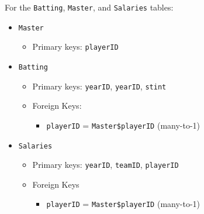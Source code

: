 \documentclass[]{book}
\providecommand{\tightlist}{%
  \setlength{\itemsep}{0pt}\setlength{\parskip}{0pt}}
\theoremstyle{plain}
\theoremstyle{remark}
\begin{document}
For the \texttt{Batting}, \texttt{Master}, and \texttt{Salaries} tables:

\begin{itemize}
\item
  \texttt{Master}

  \begin{itemize}
  \tightlist
  \item
    Primary keys: \texttt{playerID}
  \end{itemize}
\item
  \texttt{Batting}

  \begin{itemize}
  \item
    Primary keys: \texttt{yearID}, \texttt{yearID}, \texttt{stint}
  \item
    Foreign Keys:

    \begin{itemize}
    \tightlist
    \item
      \texttt{playerID} = \texttt{Master\$playerID} (many-to-1)
    \end{itemize}
  \end{itemize}
\item
  \texttt{Salaries}

  \begin{itemize}
  \item
    Primary keys: \texttt{yearID}, \texttt{teamID}, \texttt{playerID}
  \item
    Foreign Keys

    \begin{itemize}
    \tightlist
    \item
      \texttt{playerID} = \texttt{Master\$playerID} (many-to-1)
    \end{itemize}
  \end{itemize}
\end{itemize}
\end{document}

